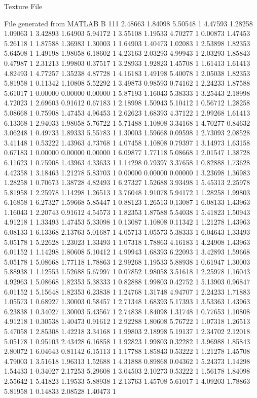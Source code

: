 Texture File

File generated from MATLAB
B 111
2.48663	1.84098	5.50548	1
4.47593	1.28258	1.09063	1
3.42893	1.64903	5.94172	1
3.55108	1.19533	4.70277	1
0.00873	1.47453	5.26118	1
1.87588	1.36983	1.30003	1
1.64903	1.40473	1.02083	1
2.53898	1.82353	5.64508	1
1.49198	1.98058	6.18602	1
4.23163	2.03293	4.99943	1
2.03293	1.85843	0.47987	1
2.31213	1.99803	0.37517	1
3.28933	1.92823	1.45708	1
1.61413	1.61413	4.82493	1
4.77257	1.35238	4.87728	1
4.16183	1.49198	5.40078	1
2.05038	1.82353	5.81958	1
0.11342	1.10808	5.52292	1
3.49873	0.98593	0.74162	1
2.24233	1.87588	5.61017	1
0.00000	0.00000	0.00000	1
5.87193	1.16043	5.38333	1
3.25443	2.18998	4.72023	1
2.69603	0.91612	0.67183	1
2.18998	1.50943	5.10412	1
0.56712	1.28258	5.08668	1
0.75908	1.47453	4.96453	1
2.62623	1.68393	4.37122	1
2.99268	1.61413	6.13368	1
2.94033	1.98058	5.76722	1
5.71488	1.10808	3.34168	1
4.70277	0.84632	3.06248	1
0.49733	1.89333	5.55783	1
1.30003	1.59668	0.09598	1
2.73093	2.08528	3.41148	1
0.53222	1.43963	4.73768	1
4.07458	1.10808	0.79397	1
3.14973	1.63158	0.67183	1
0.00000	0.00000	0.00000	1
6.09877	1.77118	5.08668	1
2.01547	1.38728	6.11623	1
0.75908	1.43963	4.33633	1
1.14298	0.79397	3.37658	1
0.82888	1.73628	4.42358	1
3.18463	1.21278	5.83703	1
0.00000	0.00000	0.00000	1
3.23698	1.36983	1.28258	1
0.70673	1.38728	4.82493	1
6.27327	1.52688	3.93498	1
5.45313	2.25978	5.81958	1
2.25978	1.14298	1.26513	1
3.76048	1.91078	5.94172	1
1.28258	1.99803	6.16858	1
6.27327	1.59668	5.85447	1
0.88123	1.26513	0.13087	1
6.08133	1.43963	1.16043	1
2.20743	0.91612	4.54573	1
1.82353	1.87588	5.54038	1
5.41823	1.50943	4.91218	1
1.33493	1.47453	5.33098	1
0.13087	1.10808	0.11342	1
1.21278	1.43963	6.08133	1
6.13368	2.13763	5.01687	1
4.05713	1.05573	5.38333	1
6.04643	1.33493	5.05178	1
5.22628	1.23023	1.33493	1
1.07318	1.78863	4.16183	1
4.24908	1.43963	6.01152	1
1.14298	1.80608	5.10412	1
4.99943	1.68393	6.22093	1
3.42893	1.59668	5.05178	1
5.08668	1.77118	1.78863	1
2.99268	1.19533	5.88938	1
0.61947	1.30003	5.88938	1
1.12553	1.52688	5.67997	1
0.07852	1.98058	3.51618	1
2.25978	1.16043	4.92963	1
5.08668	1.82353	5.38333	1
0.82888	1.99803	0.42752	1
5.13903	0.96847	6.01152	1
5.15648	1.82353	6.23838	1
1.24768	1.31748	4.94707	1
2.24233	1.71883	1.05573	1
0.68927	1.30003	0.58457	1
2.71348	1.68393	5.17393	1
3.53363	1.43963	6.23838	1
0.34027	1.30003	5.43567	1
2.74838	1.84098	1.31748	1
0.77653	1.10808	4.91218	1
0.30538	1.40473	0.91612	1
2.92288	1.80608	5.76722	1
1.07318	1.26513	5.47058	1
2.85308	1.42218	3.34168	1
1.99803	2.18998	5.19137	1
2.34702	2.12018	5.05178	1
0.95103	2.43428	6.16858	1
1.92823	1.99803	0.32282	1
3.96988	1.85843	2.80072	1
6.04643	0.81142	6.15113	1
1.17788	1.85843	0.53222	1
1.21278	1.45708	4.79003	1
3.51618	1.96313	1.52688	1
4.31888	0.89868	0.04362	1
5.24373	1.14298	1.54433	1
0.34027	2.17253	5.29608	1
3.04503	2.10273	0.53222	1
1.56178	1.84098	2.55642	1
5.41823	1.19533	5.88938	1
2.13763	1.45708	5.61017	1
4.09203	1.78863	5.81958	1
0.14833	2.08528	1.40473	1
